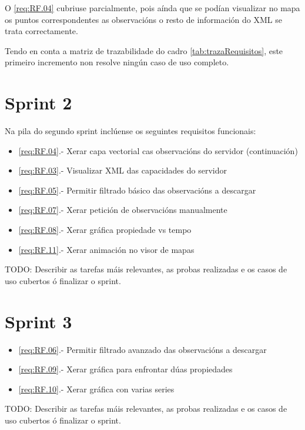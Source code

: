 O \ref{req:RF.04} cubriuse parcialmente, pois aínda que se podían visualizar no mapa os puntos correspondentes as observacións o resto de información do XML se trata correctamente.

Tendo en conta a matriz de trazabilidade do cadro \ref{tab:trazaRequisitos}, este primeiro incremento non resolve ningún caso de uso completo.

\section{Sprint 2}
Na pila do segundo sprint inclúense os seguintes requisitos funcionais:
\begin{itemize}
\item \ref{req:RF.04}.- Xerar capa vectorial cas observacións do servidor (continuación)
\item \ref{req:RF.03}.- Visualizar XML das capacidades do servidor
\item \ref{req:RF.05}.- Permitir filtrado básico das observacións a descargar
\item \ref{req:RF.07}.- Xerar petición de observacións manualmente
\item \ref{req:RF.08}.- Xerar gráfica propiedade vs tempo
\item \ref{req:RF.11}.- Xerar animación no visor de mapas
\end{itemize}

TODO: Describir as tarefas máis relevantes, as probas realizadas e os casos de uso cubertos ó finalizar o sprint.

\section{Sprint 3}

\begin{itemize}
\item \ref{req:RF.06}.- Permitir filtrado avanzado das observacións a descargar
\item \ref{req:RF.09}.- Xerar gráfica para enfrontar dúas propiedades
\item \ref{req:RF.10}.- Xerar gráfica con varias series
\end{itemize}

TODO: Describir as tarefas máis relevantes, as probas realizadas e os casos de uso cubertos ó finalizar o sprint.